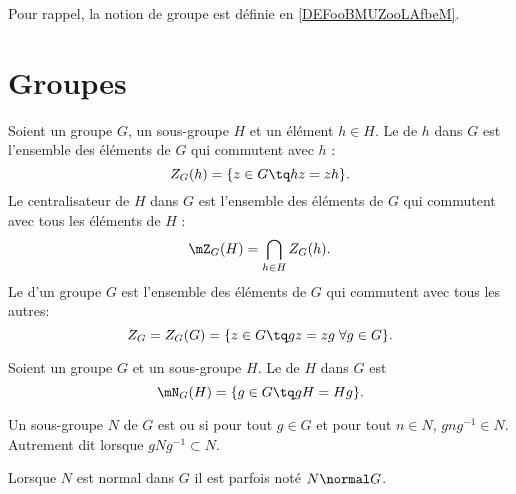 
Pour rappel, la notion de groupe est définie en \ref{DEFooBMUZooLAfbeM}.

\section{Groupes}

\begin{definition}\label{defGroupeCentre}
    Soient un groupe \( G\), un sous-groupe \( H\) et un élément \( h\in H\). Le  de \( h\) dans \( G\) est l'ensemble des éléments de \( G\) qui commutent avec \( h\) :
    \begin{equation}
        Z_G(h)=\{z\in G\tq hz=zh\}.
    \end{equation}
    Le centralisateur de $H$ dans \( G\) est l'ensemble des éléments de \( G\) qui commutent avec tous les éléments de \( H\) :
    \begin{equation}
        \mZ_G(H)=\bigcap_{h\in H}Z_G(h).
    \end{equation}
    Le  d'un groupe \( G\) est l'ensemble des éléments de \( G\) qui commutent avec tous les autres:
    \begin{equation}
        Z_G=Z_G(G)=\{ z\in G\tq gz=zg\;\forall g\in G \}.
    \end{equation}
\end{definition}

\begin{definition}      \label{DEFooZTSMooBislIy}
    Soient un groupe \( G\) et un sous-groupe \( H\). Le  de \( H\) dans \( G\) est
    \begin{equation}
        \mN_G(H)=\{ g\in G\tq gH=Hg \}.
    \end{equation}
\end{definition}

\begin{definition}    \label{DEFooNIIMooFkZgvX}
    Un sous-groupe \( N\) de \( G\) est  ou  si pour tout \( g\in G\) et pour tout \( n\in N\), \( gng^{-1}\in N\). Autrement dit lorsque \( gNg^{-1}\subset N\).

    Lorsque \( N\) est normal dans \( G\) il est parfois noté \( N\normal G\).
\end{definition}

